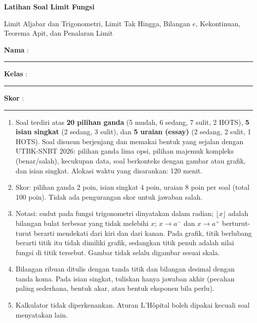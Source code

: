\documentclass[a4paper,11pt]{article}
\newcounter{no}
\begin{document}
\thispagestyle{fancy}

\begin{center}
  {\color{mainc}\fontsize{22}{26}\selectfont\bfseries Latihan Soal Limit Fungsi\par}
  \vspace{2pt}
  {\color{accc}\large Limit Aljabar dan Trigonometri, Limit Tak Hingga, Bilangan $e$, Kekontinuan, Teorema Apit, dan Penalaran Limit\par}
\end{center}
\vspace{2pt}
\begin{tcolorbox}[colback=softbg,colframe=mainc!40,boxrule=0.6pt,arc=3pt,left=8pt,right=8pt,top=5pt,bottom=5pt]
\noindent\textbf{Nama} : \rule{4.6cm}{0.4pt}\hfill\textbf{Kelas} : \rule{2.2cm}{0.4pt}\hfill\textbf{Skor} : \rule{2.2cm}{0.4pt}
\end{tcolorbox}
\vspace{2pt}
\begin{tcolorbox}[colback=white,colframe=accc,boxrule=0.8pt,arc=3pt,left=8pt,right=8pt,top=4pt,bottom=4pt,title={\bfseries Petunjuk Pengerjaan},coltitle=white,fonttitle=\small]
\small
\begin{enumerate}[leftmargin=1.4em,itemsep=1pt,topsep=1pt]
\item Soal terdiri atas \textbf{20 pilihan ganda} (5 mudah, 6 sedang, 7 sulit, 2 HOTS), \textbf{5 isian singkat} (2 sedang, 3 sulit), dan \textbf{5 uraian (essay)} (2 sedang, 2 sulit, 1 HOTS). Soal disusun berjenjang dan memakai bentuk yang sejalan dengan UTBK-SNBT 2026: pilihan ganda lima opsi, pilihan majemuk kompleks (benar/salah), kecukupan data, soal berkonteks dengan gambar atau grafik, dan isian singkat. Alokasi waktu yang disarankan: 120 menit.
\item Skor: pilihan ganda 2 poin, isian singkat 4 poin, uraian 8 poin per soal (total 100 poin). Tidak ada pengurangan skor untuk jawaban salah.
\item Notasi: sudut pada fungsi trigonometri dinyatakan dalam radian; $\lfloor x\rfloor$ adalah bilangan bulat terbesar yang tidak melebihi $x$; $x\to a^-$ dan $x\to a^+$ berturut-turut berarti mendekati dari kiri dan dari kanan. Pada grafik, titik berlubang berarti titik itu tidak dimiliki grafik, sedangkan titik penuh adalah nilai fungsi di titik tersebut. Gambar tidak selalu digambar sesuai skala.
\item Bilangan ribuan ditulis dengan tanda titik dan bilangan desimal dengan tanda koma. Pada isian singkat, tuliskan hanya jawaban akhir (pecahan paling sederhana, bentuk akar, atau bentuk eksponen bila perlu).
\item Kalkulator tidak diperkenankan. Aturan L'H\^opital boleh dipakai kecuali soal menyatakan lain.
\end{enumerate}
\end{tcolorbox}
\end{document}
